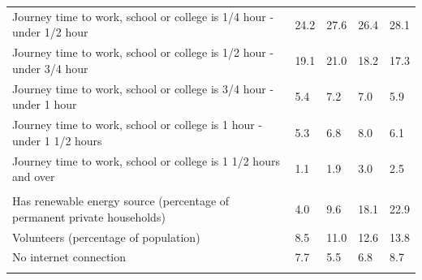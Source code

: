 \documentclass{article}
\begin{document}
\begin{table}[h]
\begin{tabular}{KTTTT}
Journey time to work, school or college is 1/4 hour - under 1/2 hour & 24.2& 27.6& 26.4& 28.1\\
Journey time to work, school or college is 1/2 hour - under 3/4 hour & 19.1& 21.0& 18.2& 17.3\\
Journey time to work, school or college is 3/4 hour - under 1 hour & 5.4& 7.2& 7.0& 5.9\\
Journey time to work, school or college is 1 hour - under 1 1/2 hours & 5.3& 6.8& 8.0& 6.1\\
Journey time to work, school or college is 1 1/2 hours and over & 1.1& 1.9& 3.0& 2.5\\
\hline
    \\ 
    \hline
Has renewable energy source (percentage of permanent private households) &  4.0&  9.6& 18.1& 22.9\\
    \hline
Volunteers (percentage of population) &  8.5& 11.0& 12.6& 13.8\\
    \hline
No internet connection& 7.7& 5.5& 6.8& 8.7\\
\hline
\end{tabular}
\end{table}
\end{document}
